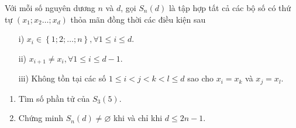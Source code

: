 \begin{bt}[VMO 2018]%
	Với mỗi số nguyên dương $n$ và $d$, gọi $S_{n}(d)$ là tập hợp tất cả các bộ số có thứ tự $(x_1;x_2\ldots;x_d)$ thỏa mãn đồng thời các điều kiện sau
	\begin{itemize}
	 \item[i)] $x_{i} \in \left\{1;2;\ldots;n\right\}, \forall 1 \le i \le d$.
	 \item[ii)] $x_{i+1} \neq x_i, \forall 1 \le i \le d-1$.
	 \item[iii)] Không tồn tại các số $1 \le i<j<k<l \le d$ sao cho $x_i=x_k$ và $x_j=x_l$.
	\end{itemize}
	\begin{enumerate}
	\item Tìm số phần tử của $S_3(5)$. 
	\item Chứng minh $S_n(d) \neq \varnothing$ khi và chỉ khi $d \le 2n-1$.
	\end{enumerate}
	

\end{bt}
